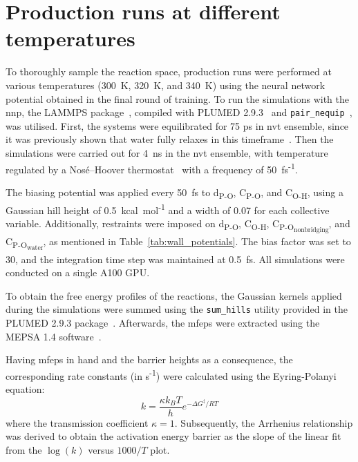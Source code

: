 
\section{Production runs at different temperatures}
To thoroughly sample the reaction space, production runs were performed at various temperatures (300~K, 320~K, and 340~K) using the neural network potential obtained in the final round of training. To run the simulations with the \ac{nnp}, the LAMMPS package~\citep{thompsonLAMMPSFlexibleSimulation2022}, compiled with PLUMED 2.9.3~\citep{tribelloPLUMED2New2014} and \texttt{pair\_nequip}~\citep{MirgroupPair_nequip}, was utilised. First, the systems were equilibrated for 75 ps in \ac{nvt} ensemble, since it was previously shown that water fully relaxes in this timeframe~\citep{moronMacroNanoScale2016}. Then the simulations were carried out for 4~ns in the \ac{nvt} ensemble, with temperature regulated by a Nos\'e--Hoover thermostat~\citep{noseUnifiedFormulationConstant1984, hooverCanonicalDynamicsEquilibrium1985} with a frequency of 50~fs\textsuperscript{-1}.

The biasing potential was applied every 50~fs to d\textsubscript{P-O}, C\textsubscript{P-O}, and C\textsubscript{O-H}, using a Gaussian hill height of 0.5~kcal~mol\textsuperscript{-1} and a width of 0.07 for each collective variable. Additionally, restraints were imposed on d\textsubscript{P-O}, C\textsubscript{O-H}, C\textsubscript{P-O\textsubscript{nonbridging}}, and C\textsubscript{P-O\textsubscript{water}}, as mentioned in Table~\ref{tab:wall_potentials}. The bias factor was set to 30, and the integration time step was maintained at 0.5~fs. All simulations were conducted on a single A100 GPU.

To obtain the free energy profiles of the reactions, the Gaussian kernels applied during the simulations were summed using the \texttt{sum\_hills} utility provided in the PLUMED 2.9.3 package~\citep{tribelloPLUMED2New2014}. Afterwards, the \acp{mfep} were extracted using the MEPSA 1.4 software~\citep{marcos-alcaldeMEPSAMinimumEnergy2015}. 

Having \acp{mfep} in hand and the barrier heights as a consequence, the corresponding rate constants (in s\textsuperscript{-1}) were calculated using the Eyring-Polanyi equation:
\begin{equation}
    k = \frac{\kappa k_B T}{h} e^{-\Delta G^\ddagger / RT}
\end{equation}
where the transmission coefficient $\kappa = 1$. Subsequently, the Arrhenius relationship was derived to obtain the activation energy barrier as the slope of the linear fit from the \(\log(k)\) versus \(1000/T\) plot.

